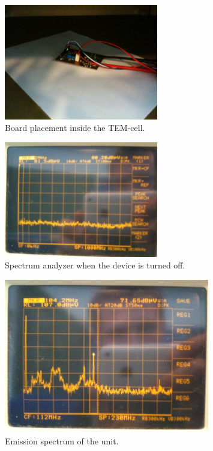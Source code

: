 \begin{figure}[H]
	\begin{centering}
		 \includegraphics[width=0.6\textwidth]{images/board_placement.jpg}
		\caption{Board placement inside the TEM-cell.}
	\end{centering}
\end{figure}

\begin{figure}[H]
	\begin{centering}
		 \includegraphics[width=0.6\textwidth]{images/measure_off.jpg}
		\caption{Spectrum analyzer when the device is turned off.}
	\end{centering}
\end{figure}

\begin{figure}[H]
	\begin{centering}
		 \includegraphics[width=0.8\textwidth]{images/measure_on.jpg}
		\caption{Emission spectrum of the unit.}
	\end{centering}
\end{figure}

